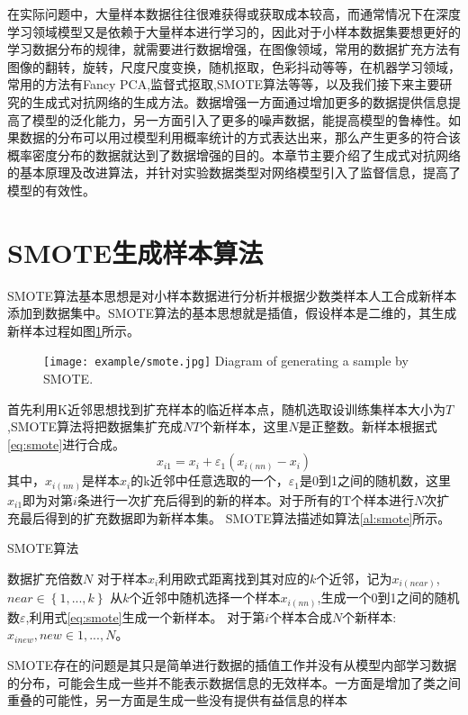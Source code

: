 在实际问题中，大量样本数据往往很难获得或获取成本较高，而通常情况下在深度学习领域模型又是依赖于大量样本进行学习的，因此对于小样本数据集要想更好的学习数据分布的规律，就需要进行数据增强，在图像领域，常用的数据扩充方法有图像的翻转，旋转，尺度尺度变换，随机抠取，色彩抖动等等，在机器学习领域，常用的方法有Fancy PCA\cite{Holdt2010Genome},监督式抠取,SMOTE算法等等，以及我们接下来主要研究的生成式对抗网络的生成方法。数据增强一方面通过增加更多的数据提供信息提高了模型的泛化能力，另一方面引入了更多的噪声数据，能提高模型的鲁棒性。如果数据的分布可以用过模型利用概率统计的方式表达出来，那么产生更多的符合该概率密度分布的数据就达到了数据增强的目的。本章节主要介绍了生成式对抗网络的基本原理及改进算法，并针对实验数据类型对网络模型引入了监督信息，提高了模型的有效性。
\section{SMOTE生成样本算法}
SMOTE算法基本思想是对小样本数据进行分析并根据少数类样本人工合成新样本添加到数据集中。SMOTE算法的基本思想就是插值，假设样本是二维的，其生成新样本过程如图\ref{fig:smote}所示。
\begin{figure}[htbp]
	\centering
	\texttt{[image: example/smote.jpg]}
	{Diagram of generating a sample by SMOTE.}
	\label{fig:smote}
\end{figure}

首先利用K近邻思想找到扩充样本的临近样本点，随机选取设训练集样本大小为$T$,SMOTE算法将把数据集扩充成$NT$个新样本，这里$N$是正整数。新样本根据式\ref{eq:smote}进行合成。
\begin{equation}
	\label{eq:smote}
	{x_{i1}} = {x_i} + {\varepsilon _1}({x_{i(nn)}} - {x_i})
\end{equation}
其中，${x_{i(nn)}}$是样本$x_i$的k近邻中任意选取的一个，$\varepsilon _1$是0到1之间的随机数，这里$x_{i1}$即为对第$i$条进行一次扩充后得到的新的样本。对于所有的T个样本进行$N$次扩充最后得到的扩充数据即为新样本集。
SMOTE算法描述如算法\ref{al:smote}所示。

\begin{algorithm}[htbp]
	\caption{SMOTE算法}%
	\label{al:smote}
	\begin{algorithmic}[1]%
		\Require
		数据扩充倍数$N$
		\State 对于样本$x_i$利用欧式距离找到其对应的$k$个近邻，记为${x_{i(near)}}$,$near\in\left\{ {1,...,k} \right\} $
		\State
		从$k$个近邻中随机选择一个样本${x_{i(nn)}}$,生成一个0到1之间的随机数$\varepsilon$,利用式\ref{eq:smote}生成一个新样本。
		\EndFor
		\State 对于第$i$个样本合成$N$个新样本:${x_{inew}},new \in 1,...,N$。
		\EndFor
	\end{algorithmic}
\end{algorithm}
SMOTE存在的问题是其只是简单进行数据的插值工作并没有从模型内部学习数据的分布，可能会生成一些并不能表示数据信息的无效样本。一方面是增加了类之间重叠的可能性，另一方面是生成一些没有提供有益信息的样本

